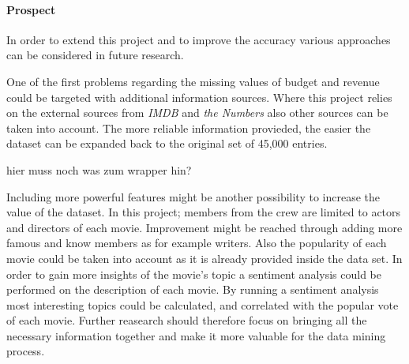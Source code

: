 \paragraph{Prospect}
In order to extend this project and to improve the accuracy various approaches can be considered in future research. 

One of the first problems regarding the missing values of budget and revenue could be targeted with additional information sources. Where this project relies on the external sources from \textit{IMDB } and \textit{the Numbers} also other sources can be taken into account. The more reliable information provieded, the easier the dataset can be expanded back to the original set of 45,000 entries.

\huge hier muss noch was zum wrapper hin?


\normalsize Including  more powerful features might be another possibility to increase the value of the dataset. In this project; members from the crew are limited to actors and directors of each movie. Improvement might be reached through adding more famous and know members as for example writers. Also the popularity of each movie could be taken into account as it is already provided inside the data set. 
In order to gain more insights of the movie's topic a sentiment analysis could be performed on the description of each movie. By running a sentiment analysis most interesting topics could be calculated, and correlated with the popular vote of each movie. Further reasearch should therefore focus on bringing all the necessary information together and make it more valuable for the data mining process.

